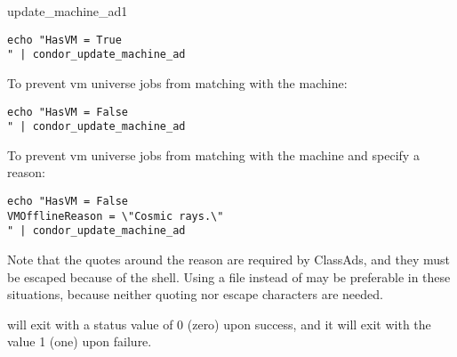 \begin{ManPage}{}{update_machine_ad}{1}
\begin{verbatim}
echo "HasVM = True
" | condor_update_machine_ad
\end{verbatim}

To prevent vm universe jobs from matching with the machine:

\begin{verbatim}
echo "HasVM = False
" | condor_update_machine_ad
\end{verbatim}

To prevent vm universe jobs from matching with the machine
and specify a reason:

\begin{verbatim}
echo "HasVM = False
VMOfflineReason = \"Cosmic rays.\"
" | condor_update_machine_ad
\end{verbatim}

Note that the quotes around the reason are required by ClassAds, 
and they must be escaped because of the shell.
Using a file instead of  may be preferable
in these situations, 
because neither quoting nor escape characters are needed.

\ExitStatus

 will exit with a status value of 0 (zero) upon
success, and it will exit with the value 1 (one) upon failure.

\end{ManPage}
